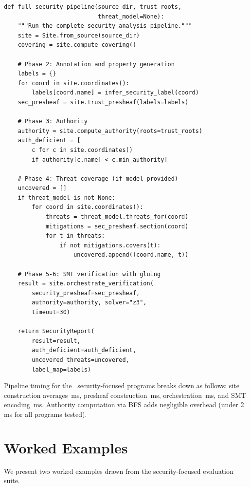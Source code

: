 \documentclass[11pt]{article}
\begin{document}
\begin{lstlisting}[style=jugeo-python]
def full_security_pipeline(source_dir, trust_roots,
                           threat_model=None):
    """Run the complete security analysis pipeline."""
    site = Site.from_source(source_dir)
    covering = site.compute_covering()

    # Phase 2: Annotation and property generation
    labels = {}
    for coord in site.coordinates():
        labels[coord.name] = infer_security_label(coord)
    sec_presheaf = site.trust_presheaf(labels=labels)

    # Phase 3: Authority
    authority = site.compute_authority(roots=trust_roots)
    auth_deficient = [
        c for c in site.coordinates()
        if authority[c.name] < c.min_authority]

    # Phase 4: Threat coverage (if model provided)
    uncovered = []
    if threat_model is not None:
        for coord in site.coordinates():
            threats = threat_model.threats_for(coord)
            mitigations = sec_presheaf.section(coord)
            for t in threats:
                if not mitigations.covers(t):
                    uncovered.append((coord.name, t))

    # Phase 5-6: SMT verification with gluing
    result = site.orchestrate_verification(
        security_presheaf=sec_presheaf,
        authority=authority, solver="z3",
        timeout=30)

    return SecurityReport(
        result=result,
        auth_deficient=auth_deficient,
        uncovered_threats=uncovered,
        label_map=labels)
\end{lstlisting}

Pipeline timing for the \ppLXIXprogramCount\ security-focused programs
breaks down as follows: site construction averages
\compSiteMeanBuildMs\,ms, presheaf construction
\compProfTrustPresheafMeanMs\,ms, orchestration
\compProfOrchestrateVerificationMeanMs\,ms, and SMT encoding
\compProfEncodeForSolverMeanMs\,ms.  Authority computation via BFS
adds negligible overhead (under 2\,ms for all programs tested).

\section{Worked Examples}\label{sec:examples}

We present two worked examples drawn from the security-focused
evaluation suite.
\end{document}

